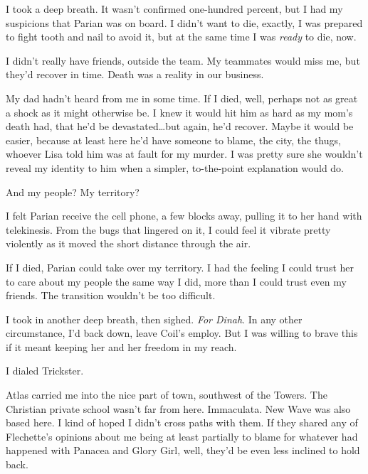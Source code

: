 I took a deep breath.  It wasn't confirmed one-hundred percent, but I had my suspicions that Parian was on board.  I didn't want to die, exactly, I was prepared to fight tooth and nail to avoid it, but at the same time I was \emph{ready }to die, now.



I didn't really have friends, outside the team.  My teammates would miss me, but they'd recover in time.  Death was a reality in our business.



My dad hadn't heard from me in some time.  If I died, well, perhaps not as great a shock as it might otherwise be.  I knew it would hit him as hard as my mom's death had, that he'd be devastated\ldots but again, he'd recover.  Maybe it would be easier, because at least here he'd have someone to blame, the city, the thugs, whoever Lisa told him was at fault for my murder.  I was pretty sure she wouldn't reveal my identity to him when a simpler, to-the-point explanation would do.



And my people?  My territory?



I felt Parian receive the cell phone, a few blocks away, pulling it to her hand with telekinesis.  From the bugs that lingered on it, I could feel it vibrate pretty violently as it moved the short distance through the air.



If I died, Parian could take over my territory.  I had the feeling I could trust her to care about my people the same way I did, more than I could trust even my friends.  The transition wouldn't be too difficult.



I took in another deep breath, then sighed.  \emph{For Dinah}.  In any other circumstance, I'd back down, leave Coil's employ.  But I was willing to brave this if it meant keeping her and her freedom in my reach.



I dialed Trickster.



\blacksquare



Atlas carried me into the nice part of town, southwest of the Towers.  The Christian private school wasn't far from here.  Immaculata.  New Wave was also based here.  I kind of hoped I didn't cross paths with them.  If they shared any of Flechette's opinions about me being at least partially to blame for whatever had happened with Panacea and Glory Girl, well, they'd be even less inclined to hold back.



